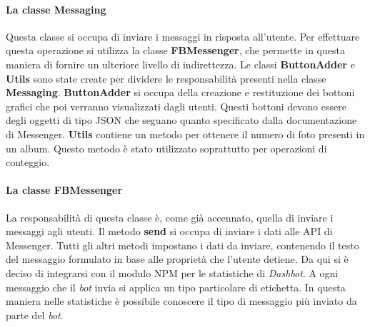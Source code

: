 
\paragraph*{La classe Messaging} Questa classe si occupa di inviare i messaggi
in risposta all'utente. Per effettuare questa operazione si utilizza la classe
\textbf{FBMessenger}, che permette in questa maniera di fornire un ulteriore
livello di indirettezza. Le classi \textbf{ButtonAdder} e \textbf{Utils} sono
state create per dividere le responsabilità presenti nella classe
\textbf{Messaging}. \textbf{ButtonAdder} si occupa della creazione e
restituzione dei bottoni grafici che poi verranno visualizzati dagli utenti.
Questi bottoni devono essere degli oggetti di tipo JSON che seguano quanto
specificato dalla documentazione di Messenger.
\textbf{Utils} contiene un metodo per ottenere il numero di foto presenti in un
album. Questo metodo è stato utilizzato soprattutto per operazioni di conteggio.

\paragraph*{La classe FBMessenger} La responsabilità di questa classe è, come
già accennato, quella di inviare i messaggi agli utenti. Il metodo
\textbf{send} si occupa di inviare i dati alle API di Messenger. Tutti gli
altri metodi impostano i dati da inviare, contenendo il testo del messaggio
formulato in base alle proprietà che l'utente detiene. Da qui si è deciso di
integrarsi con il modulo NPM per le statistiche di \textit{Dashbot}. A ogni
messaggio che il \textit{bot} invia si applica un tipo particolare di
etichetta. In questa maniera nelle statistiche è possibile conoscere il tipo di
messaggio più inviato da parte del \textit{bot}.
